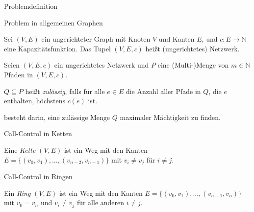 

\begin{section}{Problemdefinition}
	\begin{frame}{Problem in allgemeinen Graphen}
		\begin{definition}[Netzwerk]
			Sei $(V,E)$ ein ungerichteter Graph mit Knoten $V$ und Kanten $E$, und $c: E \to \mathbb{N}$ eine Kapazitätsfunktion.
			Das Tupel $(V,E,c)$ heißt (ungerichtetes) Netzwerk.
		\end{definition}
		\begin{definition}[\CallControl]
   			Seien $(V,E,c)$ ein ungerichtetes Netzwerk und $P$ eine (Multi-)Menge von $m \in \mathbb{N}$ Pfaden in $(V,E,c)$.

			$Q \subseteq P$ heißt {\em zulässig}, falls für alle $e \in E$ die Anzahl aller Pfade in $Q$,
			die $e$ enthalten, höchstens $c(e)$ ist.

			{\em \CallControl} besteht darin, eine zulässige Menge $Q$ maximaler Mächtigkeit zu finden.
		\end{definition}
	\end{frame}

	\begin{frame}{Call-Control in Ketten}
		\begin{definition}[Kette]
			Eine {\em Kette} $(V,E)$ ist ein Weg mit den Kanten $E=\{(v_0, v_1),\dots,(v_{n-2}, v_{n-1})\}$ mit $v_i \neq v_j$ für $i \neq j$.
		\end{definition}
	
		
	
	\end{frame}

	\begin{frame}{Call-Control in Ringen}
		\begin{definition}[Ring]
			Ein {\em Ring} $(V,E)$ ist ein Weg mit den Kanten $E=\{(v_0, v_1),\dots,(v_{n-1}, v_{n})\}$ mit $v_0 = v_n$ und $v_i \neq v_j$ für alle anderen $i \neq j$.
		\end{definition}
		

\end{frame}
\end{section}
